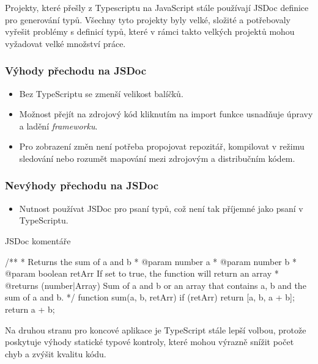 Projekty, které přešly z Typescriptu na JavaScript stále používají JSDoc definice pro generování typů. Všechny tyto projekty byly velké, složité a potřebovaly vyřešit problémy s definicí typů, které v rámci takto velkých projektů mohou vyžadovat velké množství práce. \cite{DitchingTypescript}

\subsubsection{Výhody přechodu na JSDoc}

\begin{itemize}
    \item Bez TypeScriptu se zmenší velikost balíčků.
    \item Možnost přejít na zdrojový kód kliknutím na import funkce usnadňuje úpravy a ladění \emph{frameworku}.
    \item Pro zobrazení změn není potřeba propojovat repozitář, kompilovat v režimu sledování nebo rozumět mapování mezi zdrojovým a distribučním kódem.
\end{itemize}

\subsubsection{Nevýhody přechodu na JSDoc}

\begin{itemize}
    \item Nutnost používat JSDoc pro psaní typů, což není tak příjemné jako psaní v TypeScriptu.
\end{itemize}

\begin{listing}[H]
    \caption{JSDoc komentáře \cite{JSDocExample}}
    \label{lst:jsdoc-example}
    \begin{code}[js]
/**
* Returns the sum of a and b
* @param {number} a
* @param {number} b
* @param {boolean} retArr If set to true, the function will return an array
* @returns {(number|Array)} Sum of a and b or an array that contains a, b and the sum of a and b.
*/
function sum(a, b, retArr) {
    if (retArr) {
        return [a, b, a + b];
    }
    return a + b;
}
    \end{code}
\end{listing}

Na druhou stranu pro koncové aplikace je TypeScript stále lepší volbou, protože poskytuje výhody statické typové kontroly, které mohou výrazně snížit počet chyb a zvýšit kvalitu kódu. \cite{FireshipTypescript}

